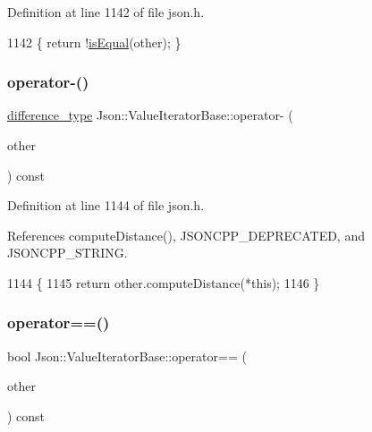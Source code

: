 Definition at line 1142 of file json.\+h.


\begin{DoxyCode}
1142 \{ \textcolor{keywordflow}{return} !\hyperlink{class_json_1_1_value_iterator_base_a010b5ad3f3337ae3732e5d7e16ca5e25}{isEqual}(other); \}
\end{DoxyCode}
\mbox{\label{class_json_1_1_value_iterator_base_a98e254263fca5f1fc8fcac7bcb0260bf}} 
\subsubsection{\texorpdfstring{operator-\/()}{operator-()}}
{\footnotesize\ttfamily \hyperlink{class_json_1_1_value_iterator_base_a4e44bf8cbd17ec8d6e2c185904a15ebd}{difference\+\_\+type} Json\+::\+Value\+Iterator\+Base\+::operator-\/ (\begin{DoxyParamCaption}\item[{const \hyperlink{class_json_1_1_value_iterator_base_a9d2a940d03ea06d20d972f41a89149ee}{Self\+Type} \&}]{other }\end{DoxyParamCaption}) const\hspace{0.3cm}{\ttfamily [inline]}}



Definition at line 1144 of file json.\+h.



References compute\+Distance(), J\+S\+O\+N\+C\+P\+P\+\_\+\+D\+E\+P\+R\+E\+C\+A\+T\+ED, and J\+S\+O\+N\+C\+P\+P\+\_\+\+S\+T\+R\+I\+NG.


\begin{DoxyCode}
1144                                                          \{
1145     \textcolor{keywordflow}{return} other.computeDistance(*\textcolor{keyword}{this});
1146   \}
\end{DoxyCode}
\mbox{\label{class_json_1_1_value_iterator_base_a1248d8016f88b51371a0fcbd355b3cfd}} 
\subsubsection{\texorpdfstring{operator==()}{operator==()}}
{\footnotesize\ttfamily bool Json\+::\+Value\+Iterator\+Base\+::operator== (\begin{DoxyParamCaption}\item[{const \hyperlink{class_json_1_1_value_iterator_base_a9d2a940d03ea06d20d972f41a89149ee}{Self\+Type} \&}]{other }\end{DoxyParamCaption}) const\hspace{0.3cm}{\ttfamily [inline]}}



